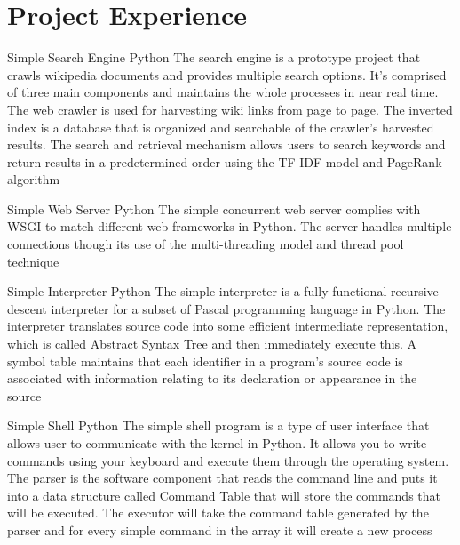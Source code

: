 \documentclass[11pt,a4paper]{moderncv}
\begin{document}

\section{Project Experience}
\cventry{}
{Simple Search Engine}
{Python}
{}{}
{
The search engine is a prototype project that crawls wikipedia documents and provides multiple search options. It's comprised of three main components and maintains the whole processes in near real time. The web crawler is used for harvesting wiki links from page to page. The inverted index is a database that is organized and searchable of the crawler's harvested results. The search and retrieval mechanism allows users to search keywords and return results in a predetermined order using the TF-IDF model and PageRank algorithm
}

\vspace*{0.2\baselineskip}
\cventry{}
{Simple Web Server}
{Python}
{}{}
{
The simple concurrent web server complies with WSGI to match different web frameworks in Python. The server handles multiple connections though its use of the multi-threading model and thread pool technique
}

\vspace*{0.2\baselineskip}
\cventry{}
{Simple Interpreter}
{Python}
{}{}
{
The simple interpreter is a fully functional recursive-descent interpreter for a subset of Pascal programming language in Python. The interpreter translates source code into some efficient intermediate representation, which is called Abstract Syntax Tree and then immediately execute this. A symbol table maintains that each identifier in a program's source code is associated with information relating to its declaration or appearance in the source
}

\vspace*{0.2\baselineskip}
\cventry{}
{Simple Shell}
{Python}
{}{}
{
The simple shell program is a type of user interface that allows user to communicate with the kernel in Python. It allows you to write commands using your keyboard and execute them through the operating system. The parser is the software component that reads the command line and puts it into a data structure called Command Table that will store the commands that will be executed. The executor will take the command table generated by the parser and for every simple command in the array it will create a new process
}
\end{document}
